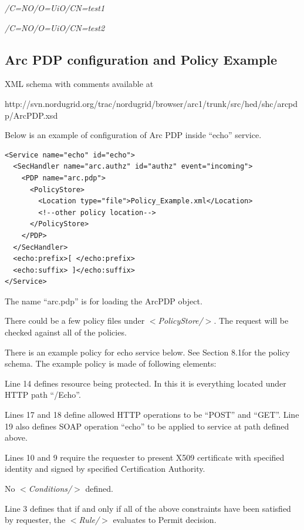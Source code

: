 \documentclass{article}                            %
\begin{document}
\emph{/C=NO/O=UiO/CN=test1}

\emph{/C=NO/O=UiO/CN=test2}



\subsection{Arc PDP configuration and Policy Example} %
\label{subsec:arcpdp_conf}
XML schema with comments available at 

http://svn.nordugrid.org/trac/nordugrid/browser/arc1/trunk/src/hed/shc/arcpdp/ArcPDP.xsd

Below is an example of configuration of Arc PDP inside ``echo'' service.
\begin{verbatim}
<Service name="echo" id="echo">
  <SecHandler name="arc.authz" id="authz" event="incoming">
    <PDP name="arc.pdp">
      <PolicyStore>
        <Location type="file">Policy_Example.xml</Location>
        <!--other policy location-->
      </PolicyStore>
    </PDP>
  </SecHandler>
  <echo:prefix>[ </echo:prefix>
  <echo:suffix> ]</echo:suffix>
</Service>
\end{verbatim}

The name ``arc.pdp'' is for loading the ArcPDP object.

There could be a few policy files under \textit{$<$PolicyStore/$>$}. The request will be checked against all of the policies.

There is an example policy for echo service below. See Section 8.1for the policy schema. The example policy is  made of following elements: 

  \begin{list}{.}
  {\setlength{\rightmargin}{\leftmargin}}
    \item Line 14  defines resource being protected. In this it is everything located under HTTP path ``/Echo''.
    \item Lines 17 and 18 define allowed HTTP operations to be ``POST'' and ``GET''. Line 19 also defines SOAP operation ``echo'' to be applied to service at path defined above.
    \item Lines 10 and 9 require the requester to present X509 certificate with specified identity and signed by specified Certification Authority.
    \item No \textit{$<$Conditions/$>$} defined.
    \item Line 3 defines that if and only if all of the above constraints have been satisfied by requester, the \textit{$<$Rule/$>$} evaluates to Permit decision.
  \end{list}
\end{document}
